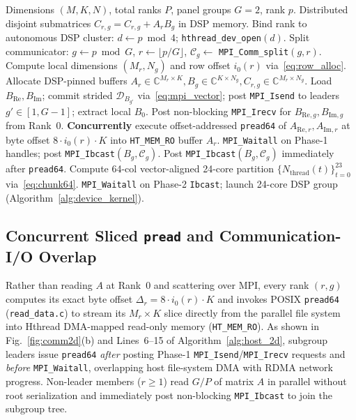 \documentclass[journal]{IEEEtran}
\begin{document}
\begin{algorithm}[t]
\caption{Host-Side 2D Hybrid Orchestration \& Overlapped Pipeline}
\label{alg:host_2d}
\footnotesize
\begin{algorithmic}[1]
\REQUIRE Dimensions $(M, K, N)$, total ranks $P$, panel groups $G=2$, rank $p$.
\ENSURE Distributed disjoint submatrices $C_{r,g} = C_{r,g} + A_r B_g$ in DSP memory.
\STATE Bind rank to autonomous DSP cluster: $d \leftarrow p \bmod 4$; \texttt{hthread\_dev\_open}$(d)$.
\STATE Split communicator: $g \leftarrow p \bmod G$, $r \leftarrow \lfloor p / G \rfloor$, $\mathcal{C}_g \leftarrow$ \texttt{MPI\_Comm\_split}$(g, r)$.
\STATE Compute local dimensions $(M_r, N_g)$ and row offset $i_0(r)$ via~\eqref{eq:row_alloc}.
\STATE Allocate DSP-pinned buffers $A_r \in \mathbb{C}^{M_r \times K}, B_g \in \mathbb{C}^{K \times N_g}, C_{r,g} \in \mathbb{C}^{M_r \times N_g}$.
    \STATE Load $B_{\mathrm{Re}}, B_{\mathrm{Im}}$; commit strided $\mathcal{D}_{B_{g'}}$ via~\eqref{eq:mpi_vector}; post \texttt{MPI\_Isend} to leaders $g' \in [1, G-1]$; extract local $B_0$. 
    \STATE Post non-blocking \texttt{MPI\_Irecv} for $B_{\mathrm{Re},g}, B_{\mathrm{Im},g}$ from Rank~0.
\ENDIF
\STATE \textbf{Concurrently} execute offset-addressed \texttt{pread64} of $A_{\mathrm{Re},r}, A_{\mathrm{Im},r}$ at byte offset $8 \cdot i_0(r) \cdot K$ into \texttt{HT\_MEM\_RO} buffer $A_r$. 
    \STATE \texttt{MPI\_Waitall} on Phase-1 handles; post \texttt{MPI\_Ibcast}$(B_g, \mathcal{C}_g)$.
\ELSE
    \STATE Post \texttt{MPI\_Ibcast}$(B_g, \mathcal{C}_g)$ immediately after \texttt{pread64}. 
\ENDIF
\STATE Compute 64-col vector-aligned 24-core partition $\{N_{\mathrm{thread}}(t)\}_{t=0}^{23}$ via~\eqref{eq:chunk64}.
\STATE \texttt{MPI\_Waitall} on Phase-2 \texttt{Ibcast}; launch 24-core DSP group (Algorithm~\ref{alg:device_kernel}).
\end{algorithmic}
\end{algorithm}

\subsection{Concurrent Sliced \texttt{pread} and Communication-I/O Overlap}
Rather than reading $A$ at Rank~0 and scattering over MPI, every rank $(r, g)$ computes its exact byte offset $\Delta_r = 8 \cdot i_0(r) \cdot K$ and invokes POSIX \texttt{pread64} (\texttt{read\_data.c}) to stream its $M_r \times K$ slice directly from the parallel file system into Hthread DMA-mapped read-only memory (\texttt{HT\_MEM\_RO}). As shown in Fig.~\ref{fig:comm2d}(b) and Lines~6--15 of Algorithm~\ref{alg:host_2d}, subgroup leaders issue \texttt{pread64} \emph{after} posting Phase-1 \texttt{MPI\_Isend}/\texttt{MPI\_Irecv} requests and \emph{before} \texttt{MPI\_Waitall}, overlapping host file-system DMA with RDMA network progress. Non-leader members ($r \ge 1$) read $G/P$ of matrix $A$ in parallel without root serialization and immediately post non-blocking \texttt{MPI\_Ibcast} to join the subgroup tree.
\end{document}
